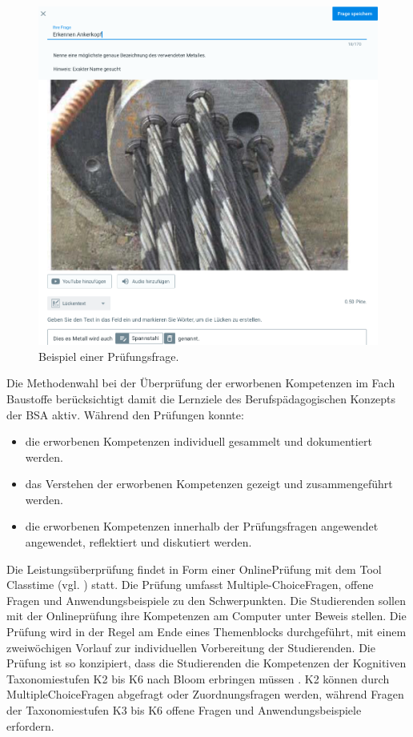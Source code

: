 \documentclass[
11pt,
captions=tableheading,
smallheadings,
headsepline,
footsepline, 
parskip=half-,
]{scrartcl}
\begin{document}
\begin{figure}[h!bt]
	\centering
	\includegraphics[width=0.7\linewidth]{Bilder/Beispiel_Anker.png}
	\caption{Beispiel einer Prüfungsfrage.}
	\label{fig:bsp_Pruefung}
\end{figure}

\FloatBarrier

Die Methodenwahl bei der Überprüfung der erworbenen Kompetenzen im Fach Baustoffe berücksichtigt damit die Lernziele des Berufspädagogischen Konzepts der BSA aktiv. Während den Prüfungen konnte:
\begin{itemize}
    \item die erworbenen Kompetenzen individuell gesammelt und dokumentiert werden.
    \item das Verstehen der erworbenen Kompetenzen gezeigt und zusammengeführt werden.
    \item die erworbenen Kompetenzen innerhalb der Prüfungsfragen angewendet angewendet, reflektiert und  diskutiert werden.
\end{itemize} 

Die Leistungsüberprüfung findet in Form einer Online­Prüfung mit dem Tool Classtime (vgl. ) statt. Die Prüfung umfasst Multiple-Choice­Fragen, offene Fragen und Anwendungsbeispiele zu den Schwerpunkten. Die Studierenden sollen mit der Onlineprüfung ihre Kompetenzen am Computer unter Beweis stellen. Die Prüfung wird in der Regel am Ende eines Themenblocks durchgeführt, mit einem zweiwöchigen Vorlauf zur individuellen Vorbereitung der Studierenden. Die Prüfung ist so konzipiert, dass die Studierenden die Kompetenzen der Kognitiven Taxonomiestufen K2 bis K6 nach Bloom erbringen müssen \cite{bloom1956taxonomy}. K2 können durch Multiple­Choice­Fragen abgefragt oder Zuordnungsfragen werden, während Fragen der Taxonomiestufen K3 bis K6 offene Fragen und Anwendungsbeispiele erfordern.
\end{document}
